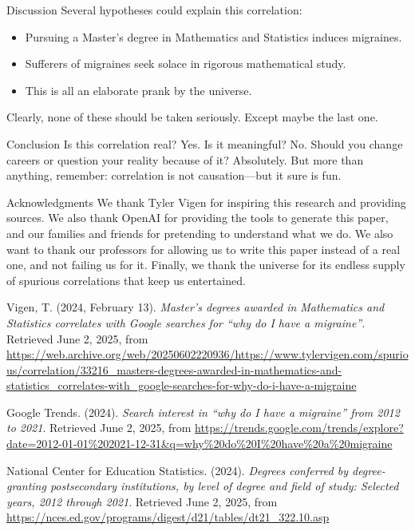 \documentclass{article}
\begin{document}
\begin{section}{Discussion}
 Several hypotheses could explain this correlation:
 \begin{itemize}
   \item Pursuing a Master's degree in Mathematics and Statistics induces migraines.
   \item Sufferers of migraines seek solace in rigorous mathematical study.
   \item This is all an elaborate prank by the universe.
 \end{itemize}
 Clearly, none of these should be taken seriously. Except maybe the last one.
\end{section}

\begin{section}{Conclusion}
 Is this correlation real? Yes. Is it meaningful? No. Should you change careers or question your reality because of it? Absolutely. But more than anything, remember: correlation is not causation—but it sure is fun.
\end{section}

\begin{section}{Acknowledgments}
 We thank Tyler Vigen for inspiring this research and providing sources. We also thank OpenAI for providing the tools to generate this paper, and our families and friends for pretending to understand what we do.
 We also want to thank our professors for allowing us to write this paper instead of a real one, and not failing us for it. Finally, we thank the universe for its endless supply of spurious correlations that keep us entertained.
\end{section}


\begin{thebibliography}{9}

  Vigen, T. (2024, February 13). \textit{Master's degrees awarded in Mathematics and Statistics correlates with Google searches for ``why do I have a migraine''}. Retrieved June 2, 2025, from \url{https://web.archive.org/web/20250602220936/https://www.tylervigen.com/spurious/correlation/33216_masters-degrees-awarded-in-mathematics-and-statistics_correlates-with_google-searches-for-why-do-i-have-a-migraine}

  Google Trends. (2024). \textit{Search interest in ``why do I have a migraine'' from 2012 to 2021}. Retrieved June 2, 2025, from \url{https://trends.google.com/trends/explore?date=2012-01-01%202021-12-31&q=why%20do%20I%20have%20a%20migraine}

  National Center for Education Statistics. (2024). \textit{Degrees conferred by degree-granting postsecondary institutions, by level of degree and field of study: Selected years, 2012 through 2021}. Retrieved June 2, 2025, from \url{https://nces.ed.gov/programs/digest/d21/tables/dt21_322.10.asp}
\end{thebibliography}
\end{document}
